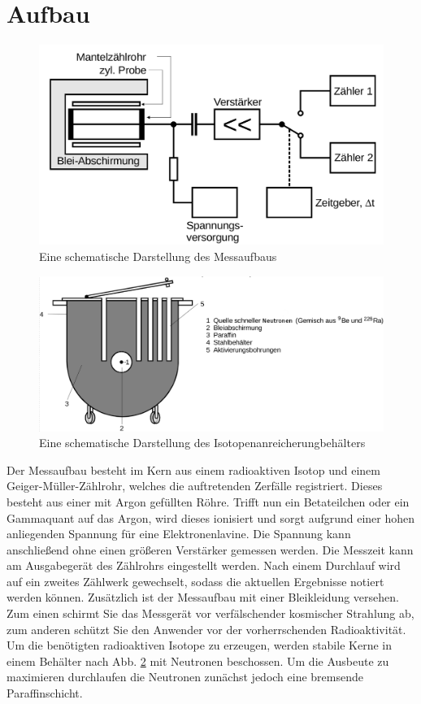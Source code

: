 \section{Aufbau}
\label{sec:Aufbau}

\begin{figure}
 \centering
 \includegraphics[width=\linewidth-70pt,height=\textheight-70pt,keepaspectratio]{content/aufbau.png}
  \caption{Eine schematische Darstellung des Messaufbaus \cite{V702}}
 \label{fig:aufbau}
\end{figure}

\begin{figure}
 \centering
 \includegraphics[width=\linewidth-70pt,height=\textheight-70pt,keepaspectratio]{content/kochtopf.png}
 \caption{Eine schematische Darstellung des Isotopenanreicherungbehälters \cite{V702}}
 \label{fig:topf}
\end{figure}


Der Messaufbau besteht im Kern aus einem radioaktiven Isotop und einem
 Geiger-Müller-Zählrohr, welches die auftretenden Zerfälle registriert. Dieses besteht aus einer mit Argon gefüllten Röhre. Trifft nun ein Betateilchen oder ein Gammaquant auf das Argon, wird dieses ionisiert und sorgt aufgrund einer hohen anliegenden Spannung für eine Elektronenlavine. Die Spannung kann anschließend ohne einen größeren Verstärker gemessen werden. Die Messzeit kann am Ausgabegerät des Zählrohrs eingestellt werden. Nach einem Durchlauf wird auf ein zweites Zählwerk gewechselt, sodass die aktuellen Ergebnisse notiert werden können. Zusätzlich ist der Messaufbau mit einer Bleikleidung versehen. Zum einen schirmt Sie das Messgerät vor verfälschender kosmischer Strahlung ab, zum anderen schützt Sie den Anwender vor der vorherrschenden Radioaktivität. Um die benötigten radioaktiven Isotope zu erzeugen, werden stabile Kerne in einem Behälter nach Abb. \ref{fig:topf} mit Neutronen beschossen. Um die Ausbeute zu maximieren durchlaufen die Neutronen zunächst jedoch eine bremsende Paraffinschicht.
